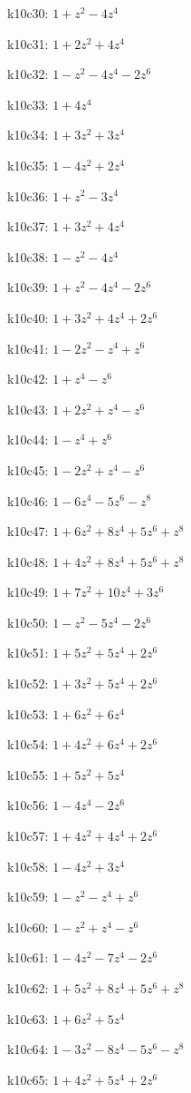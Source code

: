 k10c30: $ 1+z^{2}-4z^{4} $ 

k10c31: $ 1+2z^{2}+4z^{4} $ 

k10c32: $ 1-z^{2}-4z^{4}-2z^{6} $ 

k10c33: $ 1+4z^{4} $ 

k10c34: $ 1+3z^{2}+3z^{4} $ 

k10c35: $ 1-4z^{2}+2z^{4} $ 

k10c36: $ 1+z^{2}-3z^{4} $ 

k10c37: $ 1+3z^{2}+4z^{4} $ 

k10c38: $ 1-z^{2}-4z^{4} $ 

k10c39: $ 1+z^{2}-4z^{4}-2z^{6} $ 

k10c40: $ 1+3z^{2}+4z^{4}+2z^{6} $ 

k10c41: $ 1-2z^{2}-z^{4}+z^{6} $ 

k10c42: $ 1+z^{4}-z^{6} $ 

k10c43: $ 1+2z^{2}+z^{4}-z^{6} $ 

k10c44: $ 1-z^{4}+z^{6} $ 

k10c45: $ 1-2z^{2}+z^{4}-z^{6} $ 

k10c46: $ 1-6z^{4}-5z^{6}-z^{8} $ 

k10c47: $ 1+6z^{2}+8z^{4}+5z^{6}+z^{8} $ 

k10c48: $ 1+4z^{2}+8z^{4}+5z^{6}+z^{8} $ 

k10c49: $ 1+7z^{2}+10z^{4}+3z^{6} $ 

k10c50: $ 1-z^{2}-5z^{4}-2z^{6} $ 

k10c51: $ 1+5z^{2}+5z^{4}+2z^{6} $ 

k10c52: $ 1+3z^{2}+5z^{4}+2z^{6} $ 

k10c53: $ 1+6z^{2}+6z^{4} $ 

k10c54: $ 1+4z^{2}+6z^{4}+2z^{6} $ 

k10c55: $ 1+5z^{2}+5z^{4} $ 

k10c56: $ 1-4z^{4}-2z^{6} $ 

k10c57: $ 1+4z^{2}+4z^{4}+2z^{6} $ 

k10c58: $ 1-4z^{2}+3z^{4} $ 

k10c59: $ 1-z^{2}-z^{4}+z^{6} $ 

k10c60: $ 1-z^{2}+z^{4}-z^{6} $ 

k10c61: $ 1-4z^{2}-7z^{4}-2z^{6} $ 

k10c62: $ 1+5z^{2}+8z^{4}+5z^{6}+z^{8} $ 

k10c63: $ 1+6z^{2}+5z^{4} $ 

k10c64: $ 1-3z^{2}-8z^{4}-5z^{6}-z^{8} $ 

k10c65: $ 1+4z^{2}+5z^{4}+2z^{6} $ 

